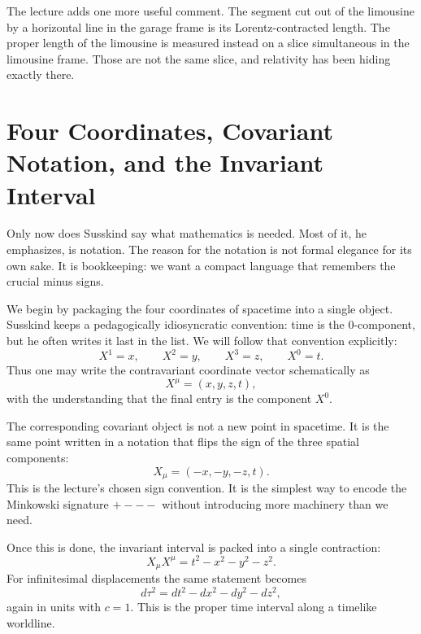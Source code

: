 The lecture adds one more useful comment. The segment cut out of the limousine by a horizontal line in the garage frame is its Lorentz-contracted length. The proper length of the limousine is measured instead on a slice simultaneous in the limousine frame. Those are not the same slice, and relativity has been hiding exactly there.

\section{Four Coordinates, Covariant Notation, and the Invariant Interval}

Only now does Susskind say what mathematics is needed. Most of it, he emphasizes, is notation. The reason for the notation is not formal elegance for its own sake. It is bookkeeping: we want a compact language that remembers the crucial minus signs.

We begin by packaging the four coordinates of spacetime into a single object. Susskind keeps a pedagogically idiosyncratic convention: time is the \(0\)-component, but he often writes it last in the list. We will follow that convention explicitly:
\begin{equation}
X^1=x,\qquad X^2=y,\qquad X^3=z,\qquad X^0=t.
\end{equation}
Thus one may write the contravariant coordinate vector schematically as
\begin{equation}
X^\mu = (x,y,z,t),
\end{equation}
with the understanding that the final entry is the component \(X^0\).

The corresponding covariant object is not a new point in spacetime. It is the same point written in a notation that flips the sign of the three spatial components:
\begin{equation}
X_\mu = (-x,-y,-z,t).
\end{equation}
This is the lecture's chosen sign convention. It is the simplest way to encode the Minkowski signature \(+---\) without introducing more machinery than we need.

Once this is done, the invariant interval is packed into a single contraction:
\begin{equation}
X_\mu X^\mu = t^2 - x^2 - y^2 - z^2.
\end{equation}
For infinitesimal displacements the same statement becomes
\begin{equation}
d\tau^2 = dt^2 - dx^2 - dy^2 - dz^2,
\end{equation}
again in units with \(c=1\). This is the proper time interval along a timelike worldline.

